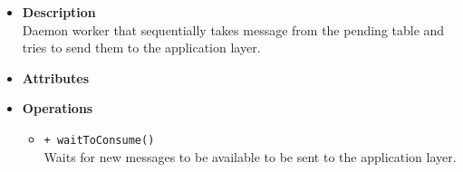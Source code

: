 \FloatBarrier
\begin{itemize}
  \item \textbf{Description} \\
    Daemon worker that sequentially takes message from the pending table and
    tries to send them to the application layer.
  \item \textbf{Attributes}
  \item \textbf{Operations}
  \begin{itemize}
    \item \texttt{+ waitToConsume()} \\
    Waits for new messages to be available to be sent to the application layer.
  \end{itemize}
\end{itemize}
